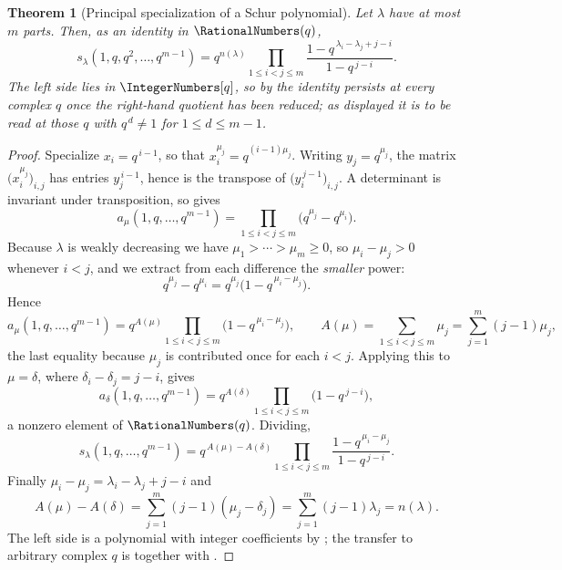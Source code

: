 \documentclass[11pt,a4paper,oneside,openany]{book}
\newtheorem{theorem}{Theorem}[chapter]
\theoremstyle{definition}
\theoremstyle{remark}
\begin{document}
\begin{theorem}[Principal specialization of a Schur polynomial]\label{thm:schur-principal}
Let $\lambda$ have at most $m$ parts.  Then, as an identity in $\RationalNumbers(q)$,
\[
 s_\lambda(1,q,q^2,\ldots,q^{m-1})
 =q^{n(\lambda)}
 \prod_{1\le i<j\le m}
 \frac{1-q^{\,\lambda_i-\lambda_j+j-i}}{1-q^{\,j-i}}.
\]
The left side lies in $\IntegerNumbers[q]$, so by  the
identity persists at every complex $q$ once the right-hand quotient has been
reduced; as displayed it is to be read at those $q$ with $q^{\,d}\ne1$ for
$1\le d\le m-1$.
\end{theorem}

\begin{proof}
Specialize $x_i=q^{\,i-1}$, so that $x_i^{\mu_j}=q^{(i-1)\mu_j}$.  Writing
$y_j=q^{\mu_j}$, the matrix $\bigl(x_i^{\mu_j}\bigr)_{i,j}$ has entries
$y_j^{\,i-1}$, hence is the transpose of $\bigl(y_i^{\,j-1}\bigr)_{i,j}$.
A determinant is invariant under transposition, so
 gives
\[
 a_\mu(1,q,\ldots,q^{m-1})
 =\prod_{1\le i<j\le m}\bigl(q^{\mu_j}-q^{\mu_i}\bigr).
\]
Because $\lambda$ is weakly decreasing we have $\mu_1>\cdots>\mu_m\ge0$, so
$\mu_i-\mu_j>0$ whenever $i<j$, and we extract from each difference the
\emph{smaller} power:
\[
 q^{\mu_j}-q^{\mu_i}=q^{\mu_j}\bigl(1-q^{\,\mu_i-\mu_j}\bigr).
\]
Hence
\[
 a_\mu(1,q,\ldots,q^{m-1})
 =q^{A(\mu)}\prod_{1\le i<j\le m}\bigl(1-q^{\,\mu_i-\mu_j}\bigr),
 \qquad
 A(\mu)=\sum_{1\le i<j\le m}\mu_j=\sum_{j=1}^{m}(j-1)\mu_j,
\]
the last equality because $\mu_j$ is contributed once for each $i<j$.
Applying this to $\mu=\delta$, where $\delta_i-\delta_j=j-i$, gives
\[
 a_\delta(1,q,\ldots,q^{m-1})
 =q^{A(\delta)}\prod_{1\le i<j\le m}\bigl(1-q^{\,j-i}\bigr),
\]
a nonzero element of $\RationalNumbers(q)$.  Dividing,
\[
 s_\lambda(1,q,\ldots,q^{m-1})
 =q^{\,A(\mu)-A(\delta)}
 \prod_{1\le i<j\le m}
 \frac{1-q^{\,\mu_i-\mu_j}}{1-q^{\,j-i}}.
\]
Finally $\mu_i-\mu_j=\lambda_i-\lambda_j+j-i$ and
\[
 A(\mu)-A(\delta)=\sum_{j=1}^{m}(j-1)(\mu_j-\delta_j)
 =\sum_{j=1}^{m}(j-1)\lambda_j=n(\lambda).
\]
The left side is a polynomial with integer coefficients by
; the transfer to arbitrary complex $q$ is
 together with
.
\end{proof}
\end{document}
